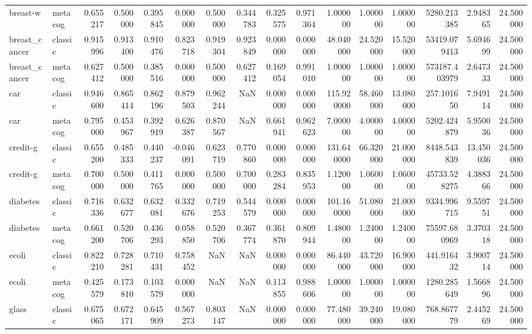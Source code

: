 \begin{tabular}{llrrrrrrrrrrrrrr}
breast-w & metacog & 0.655217 & 0.500000 & 0.395845 & 0.000000 & 0.500000 & 0.344783 & 0.325575 & 0.971364 & 1.000000 & 1.000000 & 1.000000 & 5280.213385 & 2.948365 & 24.500000 \\
breast_cancer & classic & 0.915996 & 0.913400 & 0.910476 & 0.823718 & 0.919304 & 0.923849 & 0.000000 & 0.000000 & 48.040000 & 24.520000 & 15.520000 & 53419.079413 & 5.694699 & 24.500000 \\
breast_cancer & metacog & 0.627412 & 0.500000 & 0.385516 & 0.000000 & 0.500000 & 0.627412 & 0.169054 & 0.991010 & 1.000000 & 1.000000 & 1.000000 & 573187.403979 & 2.647333 & 24.500000 \\
car & classic & 0.946600 & 0.865414 & 0.862196 & 0.879503 & 0.962244 & NaN & 0.000000 & 0.000000 & 115.920000 & 58.460000 & 13.080000 & 257.101650 & 7.949114 & 24.500000 \\
car & metacog & 0.795000 & 0.453967 & 0.392919 & 0.626387 & 0.870567 & NaN & 0.661941 & 0.962623 & 7.000000 & 4.000000 & 4.000000 & 5202.424879 & 5.950036 & 24.500000 \\
credit-g & classic & 0.655200 & 0.485333 & 0.440237 & -0.046091 & 0.623719 & 0.770860 & 0.000000 & 0.000000 & 131.640000 & 66.320000 & 21.000000 & 8448.543839 & 13.450036 & 24.500000 \\
credit-g & metacog & 0.700000 & 0.500000 & 0.411765 & 0.000000 & 0.500000 & 0.700000 & 0.283284 & 0.835953 & 1.120000 & 1.060000 & 1.060000 & 45733.528275 & 4.388366 & 24.500000 \\
diabetes & classic & 0.716336 & 0.632677 & 0.632081 & 0.332676 & 0.719253 & 0.544579 & 0.000000 & 0.000000 & 101.160000 & 51.080000 & 21.000000 & 9334.996715 & 9.559751 & 24.500000 \\
diabetes & metacog & 0.661200 & 0.520706 & 0.436293 & 0.058850 & 0.520706 & 0.367774 & 0.361870 & 0.809944 & 1.480000 & 1.240000 & 1.240000 & 75597.680969 & 3.370318 & 24.500000 \\
ecoli & classic & 0.822210 & 0.728281 & 0.710431 & 0.758452 & NaN & NaN & 0.000000 & 0.000000 & 86.440000 & 43.720000 & 16.900000 & 441.916432 & 3.900714 & 24.500000 \\
ecoli & metacog & 0.425579 & 0.173810 & 0.103579 & 0.000000 & NaN & NaN & 0.113855 & 0.988606 & 1.000000 & 1.000000 & 1.000000 & 1280.285649 & 1.566896 & 24.500000 \\
glass & classic & 0.675065 & 0.672171 & 0.645909 & 0.567273 & 0.803147 & NaN & 0.000000 & 0.000000 & 77.480000 & 39.240000 & 19.080000 & 768.867779 & 2.445269 & 24.500000 \\

\end{tabular}
